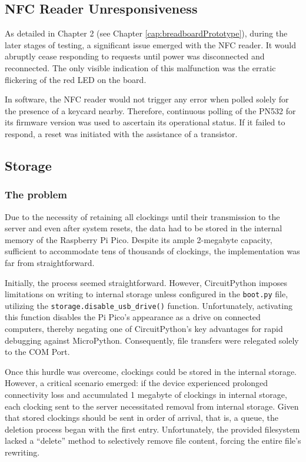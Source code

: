 \subsection{NFC Reader Unresponsiveness}

As detailed in Chapter 2 (see Chapter \ref{cap:breadboardPrototype}), during the later stages of 
testing, a significant issue emerged with the NFC reader. It would abruptly cease responding to 
requests until power was disconnected and reconnected. The only visible indication of this 
malfunction was the erratic flickering of the red LED on the board.

In software, the NFC reader would not trigger any error when polled solely for the presence of a 
keycard nearby. Therefore, continuous polling of the PN532 for its firmware version was used to 
ascertain its operational status. If it failed to respond, a reset was initiated with the 
assistance of a transistor.

\subsection{Storage}

\subsubsection*{The problem}
Due to the necessity of retaining all clockings until their transmission to the server and even 
after system resets, the data had to be stored in the internal memory of the Raspberry Pi Pico. 
Despite its ample 2-megabyte capacity, sufficient to accommodate tens of thousands of clockings, 
the implementation was far from straightforward.

Initially, the process seemed straightforward. However, CircuitPython imposes limitations on 
writing to internal storage unless configured in the \texttt{boot.py} file, utilizing the 
\texttt{storage.disable\_usb\_drive()} function. Unfortunately, activating this function disables 
the Pi Pico's appearance as a drive on connected computers, thereby negating one of CircuitPython's 
key advantages for rapid debugging against MicroPython. Consequently, file transfers were relegated 
solely to the COM Port.

Once this hurdle was overcome, clockings could be stored in the internal storage. However, a 
critical scenario emerged: if the device experienced prolonged connectivity loss and accumulated 1 
megabyte of clockings in internal storage, each clocking sent to the server necessitated removal 
from internal storage. Given that stored clockings should be sent in order of arrival, that is, a 
queue, the deletion process began with the first entry. Unfortunately, the provided filesystem 
lacked a ``delete'' method to selectively remove file content, forcing the entire file's rewriting.

